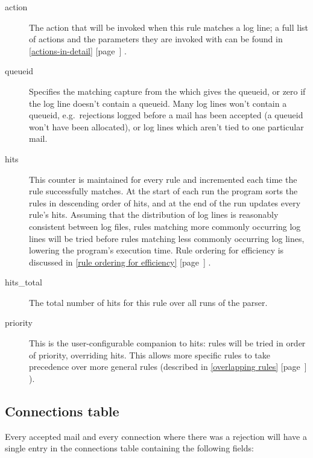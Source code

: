\documentclass[a4paper,12pt,draft]{article}
\newcommand{\refwithpage}[1]{%
    \empty{}\ref{#1} [page~\pageref{#1}]%
}
\newcommand{\sectionref}[1]{%
    \textsection{}\refwithpage{#1}%
}
\begin{document}
\begin{description}
    \item [action] The action that will be invoked when this rule matches a
        log line; a full list of actions and the parameters they are
        invoked with can be found in \sectionref{actions-in-detail}.

    \item [queueid] Specifies the matching capture from the \regex{} which
        gives the queueid, or zero if the log line doesn't contain a
        queueid.  Many log lines won't contain a queueid, e.g.\ rejections
        logged before a mail has been accepted (a queueid won't have been
        allocated), or log lines which aren't tied to one particular mail.

    \item [hits] This counter is maintained for every rule and incremented
        each time the rule successfully matches.  At the start of each run
        the program sorts the rules in descending order of hits, and at the
        end of the run updates every rule's hits.  Assuming that the
        distribution of log lines is reasonably consistent between log
        files, rules matching more commonly occurring log lines will be
        tried before rules matching less commonly occurring log lines,
        lowering the program's execution time.  Rule ordering for
        efficiency is discussed in \sectionref{rule ordering for
        efficiency}.

    \item [hits\_total] The total number of hits for this rule over all
        runs of the parser.

    \item [priority] This is the user-configurable companion to hits: rules
        will be tried in order of priority, overriding hits.  This allows
        more specific rules to take precedence over more general rules
        (described in \sectionref{overlapping rules}).

\end{description}


\subsection{Connections table}

\label{connections table}

Every accepted mail and every connection where there was a rejection will
have a single entry in the connections table containing the following
fields:
\end{document}
